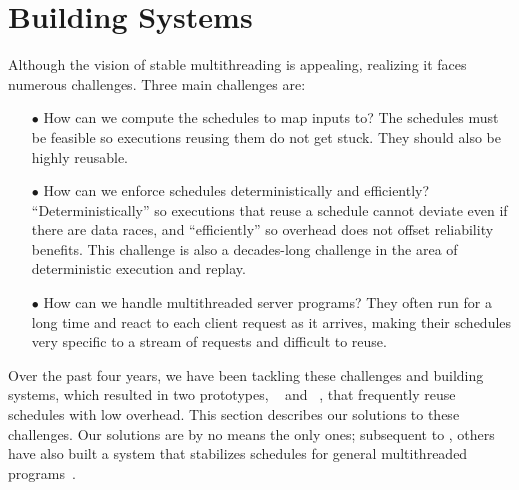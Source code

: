 \section{Building \smt Systems} \label{sec:done}

Although the vision of stable multithreading is appealing, realizing it
faces numerous challenges.  Three main challenges are:

\begin{enumerate}

\item[$\bullet$] How can we compute the schedules to map inputs to?  The 
schedules
  must be feasible so executions reusing them do not get stuck.
  They should also be highly reusable.

\item[$\bullet$] How can we enforce schedules deterministically and
  efficiently?  ``Deterministically'' so executions that reuse a schedule
  cannot deviate even if there are data races, and ``efficiently'' so
  overhead does not offset reliability benefits.
  This challenge is also a decades-long challenge in the area of
  deterministic execution and replay.

\item[$\bullet$] How can we handle multithreaded server programs?  They often 
run for a
  long time and react to each client request as it arrives, making their
  schedules very specific to a stream of requests and difficult to reuse.

\end{enumerate}

Over the past four years, we have been tackling these challenges and
building \smt systems, which resulted in two \smt prototypes,
\tern~\cite{cui:tern:osdi10} and \peregrine~\cite{peregrine:sosp11}, that
frequently reuse schedules with low overhead.  This section describes our
solutions to these challenges.  Our solutions are by no means the only
ones; subsequent to \tern, others have also built a system that
stabilizes schedules for general multithreaded programs~\cite{dthreads:sosp11}.










